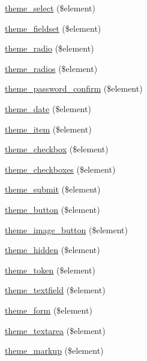 \begin{CompactItemize}
\item 
\hyperlink{group__themeable_g8bd27279d058958f1154af742111807d}{theme\_\-select} (\$element)
\item 
\hyperlink{group__themeable_g32be85aae1eb7b600c464065d437f44a}{theme\_\-fieldset} (\$element)
\item 
\hyperlink{group__themeable_g3b9b7e0926e0b315d352192c1141b009}{theme\_\-radio} (\$element)
\item 
\hyperlink{group__themeable_g4efafeaac5bf313d3b83ac0f8e4df133}{theme\_\-radios} (\$element)
\item 
\hyperlink{group__themeable_g5a4796f142665416c8dc871dca424288}{theme\_\-password\_\-confirm} (\$element)
\item 
\hyperlink{group__themeable_g88b275cc95a32c585d1e913cb63e1f1e}{theme\_\-date} (\$element)
\item 
\hyperlink{group__themeable_g41b3e3d7567fc1fdb6e777d53ef21fc7}{theme\_\-item} (\$element)
\item 
\hyperlink{group__themeable_g70f81ff11154f10ca50ad429a9e29cd6}{theme\_\-checkbox} (\$element)
\item 
\hyperlink{group__themeable_ga4d5e2072b3b90ff9f09424e34dfae02}{theme\_\-checkboxes} (\$element)
\item 
\hyperlink{group__themeable_g72d55d80f4f8ca2793330dd9cde4ea61}{theme\_\-submit} (\$element)
\item 
\hyperlink{group__themeable_g8c060aea7d7b974f4c61eb1ee9a5feb8}{theme\_\-button} (\$element)
\item 
\hyperlink{group__themeable_gef0c290973d09b09d2d991547877be20}{theme\_\-image\_\-button} (\$element)
\item 
\hyperlink{group__themeable_g4c3dee9315931d8403bf37aa6481cffb}{theme\_\-hidden} (\$element)
\item 
\hyperlink{group__themeable_gea7f1c9cd64fdf5a1444da708fa44aa3}{theme\_\-token} (\$element)
\item 
\hyperlink{group__themeable_gbecfa8f4d68e6eaf20469e668ad8028a}{theme\_\-textfield} (\$element)
\item 
\hyperlink{group__themeable_g345d44aab3681cd74df8aea85d367f69}{theme\_\-form} (\$element)
\item 
\hyperlink{group__themeable_g75a9f062a41e0208ae2a70feaf715109}{theme\_\-textarea} (\$element)
\item 
\hyperlink{group__themeable_gca9903e6eff98f89feffcea1fd144fc2}{theme\_\-markup} (\$element)
\item 

\end{CompactItemize}
